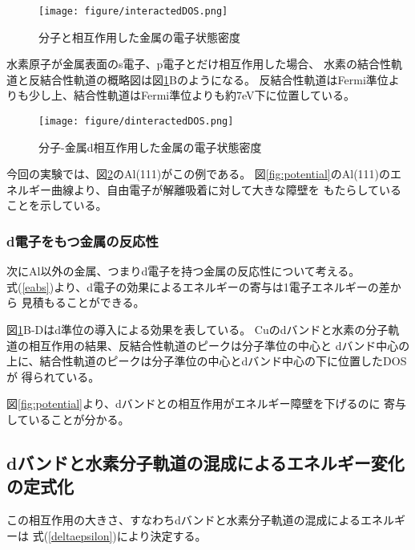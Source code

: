\documentclass[12pt]{ltjsarticle}
\begin{document}
\begin{figure}[hbtp]
    \begin{center}
     \texttt{[image: figure/interactedDOS.png]}
    \end{center}
    \caption{分子と相互作用した金属の電子状態密度}
    \label{fig:interactedDOS}
\end{figure}

水素原子が金属表面のs電子、p電子とだけ相互作用した場合、
水素の結合性軌道と反結合性軌道の概略図は図\ref{fig:interactedDOS}Bのようになる。
反結合性軌道はFermi準位よりも少し上、結合性軌道はFermi準位よりも約7eV下に位置している。

\begin{figure}[hbtp]
    \begin{center}
     \texttt{[image: figure/dinteractedDOS.png]}
    \end{center}
    \caption{分子-金属d相互作用した金属の電子状態密度}
    \label{fig:dinteractedDOS}
\end{figure}

今回の実験では、図\ref{fig:dinteractedDOS}のAl(111)がこの例である。
図\ref{fig:potential}のAl(111)のエネルギー曲線より、自由電子が解離吸着に対して大きな障壁を
もたらしていることを示している。\cite{Mysyrowicz1993}

\subsubsection{d電子をもつ金属の反応性}
次にAl以外の金属、つまりd電子を持つ金属の反応性について考える。\\
式(\ref{eabs})より、d電子の効果によるエネルギーの寄与は1電子エネルギーの差から
見積もることができる。

図\ref{fig:interactedDOS}B-Dはd準位の導入による効果を表している。
Cuのdバンドと水素の分子軌道の相互作用の結果、反結合性軌道のピークは分子準位の中心と
dバンド中心の上に、結合性軌道のピークは分子準位の中心とdバンド中心の下に位置したDOSが
得られている。

図\ref{fig:potential}より、dバンドとの相互作用がエネルギー障壁を下げるのに
寄与していることが分かる。

\subsection{dバンドと水素分子軌道の混成によるエネルギー変化の定式化}
この相互作用の大きさ、すなわちdバンドと水素分子軌道の混成によるエネルギーは
式(\ref{deltaepsilon})により決定する。
\end{document}
